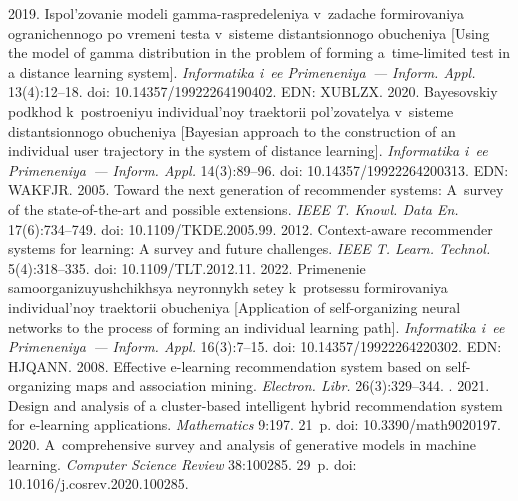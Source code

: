 \begin{multicols}{2}
{{\begin{thebibliography}{99}
 2019. Ispol'zovanie 
modeli gamma-raspredeleniya v~zadache formirovaniya ogranichennogo po vremeni testa v~sisteme 
distantsionnogo obucheniya [Using the model of gamma distribution in the problem of forming  
a~time-limited test in a distance learning system]. \textit{Informatika i~ee Primeneniya~--- Inform. 
Appl.} 13(4):12--18. doi: 10.14357/19922264190402. EDN: XUBLZX.
 2020. Bayesovskiy 
podkhod k~po\-stro\-eniyu individual'noy traektorii pol'zovatelya v~sisteme dis\-tan\-tsi\-on\-no\-go obuche\-niya 
[Bayesian approach to the construction of an individual user trajectory in the system of distance learning]. 
\textit{Informatika i~ee Primeneniya~--- Inform. Appl.} 14(3):89--96. doi: 10.14357/19922264200313. 
EDN: WAKFJR.
 2005. Toward the next generation of recommender systems: 
A~survey of the state-of-the-art and possible extensions. \textit{IEEE T. Knowl. Data En.}  
17(6):734--749. doi: 10.1109/TKDE.2005.99.
2012. Context-aware recommender systems for learning: A survey and future challenges. \textit{IEEE T. 
Learn. Technol.} 5(4):318--335. doi: 10.1109/TLT.2012.11.
 2022. Primenenie sa\-mo\-or\-ga\-ni\-zu\-yushchikh\-sya neyronnykh setey k~protsessu 
for\-mi\-ro\-va\-niya individual'noy traektorii obucheniya [Application of self-organizing neural networks to 
the process of forming an individual learning path]. \textit{Informatika i~ee Primeneniya~--- Inform. 
Appl.} 16(3):7--15. doi: 10.14357/19922264220302. EDN: HJQANN.
 2008. Effective \mbox{e-learning} recommendation system 
based on self-organizing maps and association mining. \textit{Electron. Libr.} 26(3):329--344.
. 2021. Design and analysis of a cluster-based 
intelligent hybrid recommendation system for e-learning applications. \textit{Mathematics} 9:197. 21~p. 
doi: 10.3390/math9020197.
 2020. 
A~comprehensive survey and analysis of generative models in machine learning. \textit{Computer Science 
Review} 38:100285. 29~p. doi: 10.1016/j.cosrev.2020.100285.

\end{thebibliography}}}
\end{multicols}
